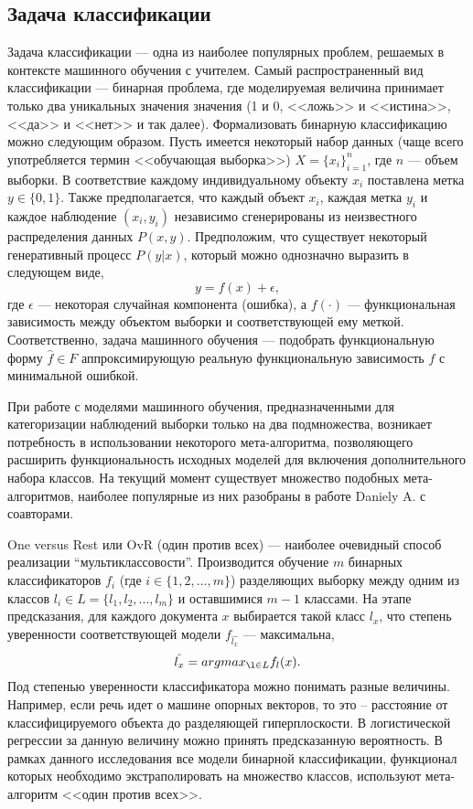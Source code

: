\documentclass[runningheads]{llncs}
\begin{document}
\subsection{Задача классификации}
Задача классификации — одна из наиболее популярных проблем, решаемых в контексте машинного обучения с учителем. Самый распространенный вид классификации — бинарная проблема, где моделируемая величина принимает только два уникальных значения значения (1 и 0, <<ложь>> и <<истина>>, <<да>> и <<нет>> и так далее). Формализовать бинарную классификацию можно следующим образом. Пусть имеется некоторый набор данных (чаще всего употребляется термин <<обучающая выборка>>) $X = \{x_i\}_{i=1}^n$, где $n$ — объем выборки. В соответствие каждому индивидуальному объекту $x_i$ поставлена метка $y \in \{0, 1\}$. Также предполагается, что каждый объект $x_i$, каждая метка $y_i$ и каждое наблюдение $(x_i, y_i)$ независимо сгенерированы из неизвестного распределения данных $P(x, y)$. Предположим, что существует некоторый генеративный процесс $P(y | x)$, который можно однозначно выразить в следующем виде,
$$y = f(x) + \epsilon,$$
где $\epsilon$ — некоторая случайная компонента (ошибка), а $f(\cdot)$ — функциональная зависимость между объектом выборки и соответствующей ему меткой. Соответственно, задача машинного обучения — подобрать функциональную форму $\hat{f} \in F$ аппроксимирующую реальную функциональную зависимость $f$ с минимальной ошибкой. \par
При работе с моделями машинного обучения, предназначенными для категоризации наблюдений выборки только на два подмножества, возникает потребность в использовании некоторого мета-алгоритма, позволяющего расширить функциональность исходных моделей для включения дополнительного набора классов. На текущий момент существует множество подобных мета-алгоритмов, наиболее популярные из них разобраны в работе Daniely A. \cite{multiclass} с соавторами. \par
One versus Rest или OvR (один против всех) — наиболее очевидный способ реализации “мультиклассовости”. Производится обучение $m$ бинарных классификаторов $f_i$ (где $i \in \{1, 2, ..., m\}$) разделяющих выборку между одним из классов $l_i \in L= \{l_1, l_2, ..., l_m\}$ и оставшимися $m - 1$ классами. На этапе предсказания, для каждого документа $x$ выбирается такой класс $\hat{l_x}$, что степень уверенности соответствующей модели $f_{\hat{l_x}}$ — максимальна,
$$\hat{l_x} = arg max_{\l \in L} f_l(x).$$
Под степенью уверенности классификатора можно понимать разные величины. Например, если речь идет о машине опорных векторов, то это – расстояние от классифицируемого объекта до разделяющей гиперплоскости. В логистической регрессии за данную величину можно принять предсказанную вероятность. В рамках данного исследования все модели бинарной классификации, функционал которых необходимо экстраполировать на множество классов, используют мета-алгоритм <<один против всех>>. \par
\end{document}
